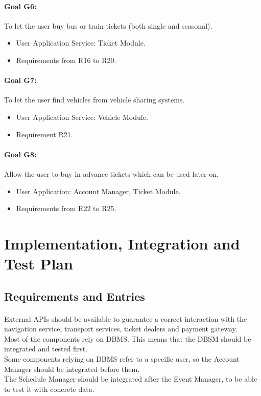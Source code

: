 \documentclass{article}
\begin{document}
		\paragraph{Goal G6:}To let the user buy bus or train tickets (both single and seasonal).
		\begin{itemize}
		\item{}User Application Service: Ticket Module.
		\item{}Requirements from R16 to R20.
		\end{itemize}
		\paragraph{Goal G7:}To let the user find vehicles from vehicle sharing systems.
		\begin{itemize}
		\item{} User Application Service: Vehicle Module.
		\item{} Requirement R21.
		\end{itemize}
		\paragraph{Goal G8:}Allow the user to buy in advance tickets which can be used later on.
		\begin{itemize}
		\item{} User Application: Account Manager, Ticket Module.
		\item{} Requirements from R22 to R25.
		\end{itemize}
	\newpage
	\section{Implementation, Integration and Test Plan}
		\subsection{Requirements and Entries}
		\paragraph{}External APIs should be available to guarantee a correct interaction with the navigation service, transport services, ticket dealers and payment gateway.\\Most of the components rely on DBMS. This means that the DBSM should be integrated and tested first.\\Some components relying on DBMS refer to a specific user, so the Account Manager should be integrated before them.\\The Schedule Manager should be integrated after the Event Manager, to be able to test it with concrete data.
\end{document}
